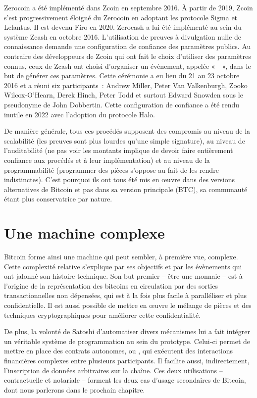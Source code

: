 Zerocoin a été implémenté dans Zcoin en septembre 2016. À partir de 2019, Zcoin s'est progressivement éloigné du Zerocoin en adoptant les protocole Sigma et Lelantus. Il est devenu Firo en 2020. Zerocash a lui été implémenté au sein du système Zcash en octobre 2016. L'utilisation de preuves à divulgation nulle de connaissance demande une configuration de confiance des paramètres publics. Au contraire des développeurs de Zcoin qui ont fait le choix d'utiliser des paramètres connus, ceux de Zcash ont choisi d'organiser un évènement, appelée «~~», dans le but de générer ces paramètres. Cette cérémonie a eu lieu du 21 au 23 octobre 2016 et a réuni six participants~: Andrew Miller, Peter Van Valkenburgh, Zooko Wilcox-O'Hearn, Derek Hinch, Peter Todd et surtout Edward Snowden sous le pseudonyme de John Dobbertin. Cette configuration de confiance a été rendu inutile en 2022 avec l'adoption du protocole Halo.

De manière générale, tous ces procédés supposent des compromis au niveau de la scalabilité (les preuves sont plus lourdes qu'une simple signature), au niveau de l'auditabilité (ne pas voir les montants implique de devoir faire entièrement confiance aux procédés et à leur implémentation) et au niveau de la programmabilité (programmer des pièces s'oppose au fait de les rendre indistinctes). C'est pourquoi ils ont tous été mis en œuvre dans des versions alternatives de Bitcoin et pas dans sa version principale (BTC), sa communauté étant plus conservatrice par nature.

\section*{Une machine complexe}

Bitcoin forme ainsi une machine qui peut sembler, à première vue, complexe. Cette complexité relative s'explique par ses objectifs et par les évènements qui ont jalonné son histoire technique. Son but premier -- être une monnaie -- est à l'origine de la représentation des bitcoins en circulation par des sorties transactionnelles non dépensées, qui est à la fois plus facile à paralléliser et plus confidentielle. Il est aussi possible de mettre en œuvre le mélange de pièces et des techniques cryptographiques pour améliorer cette confidentialité.

De plus, la volonté de Satoshi d'automatiser divers mécanismes lui a fait intégrer un véritable système de programmation au sein du prototype. Celui-ci permet de mettre en place des contrats autonomes, ou , qui exécutent des interactions financières complexes entre plusieurs participants. Il facilite aussi, indirectement, l'inscription de données arbitraires sur la chaîne. Ces deux utilisations -- contractuelle et notariale -- forment les deux cas d'usage secondaires de Bitcoin, dont nous parlerons dans le prochain chapitre.